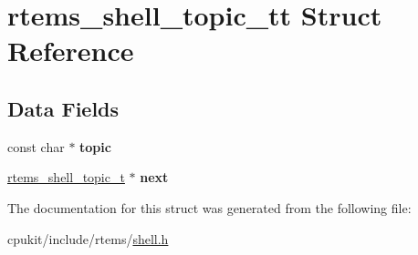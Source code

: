 \hypertarget{structrtems__shell__topic__tt}{}\section{rtems\+\_\+shell\+\_\+topic\+\_\+tt Struct Reference}
\label{structrtems__shell__topic__tt}
\subsection*{Data Fields}
\begin{DoxyCompactItemize}
\item 
\mbox{\label{structrtems__shell__topic__tt_af71c3e7913d178d4c4c22cda9f864644}} 
const char $\ast$ {\bfseries topic}
\item 
\mbox{\label{structrtems__shell__topic__tt_af64af78172bc14034b225d5bac849cf2}} 
\mbox{\hyperlink{structrtems__shell__topic__tt}{rtems\+\_\+shell\+\_\+topic\+\_\+t}} $\ast$ {\bfseries next}
\end{DoxyCompactItemize}


The documentation for this struct was generated from the following file\+:\begin{DoxyCompactItemize}
\item 
cpukit/include/rtems/\mbox{\hyperlink{shell_8h}{shell.\+h}}\end{DoxyCompactItemize}
